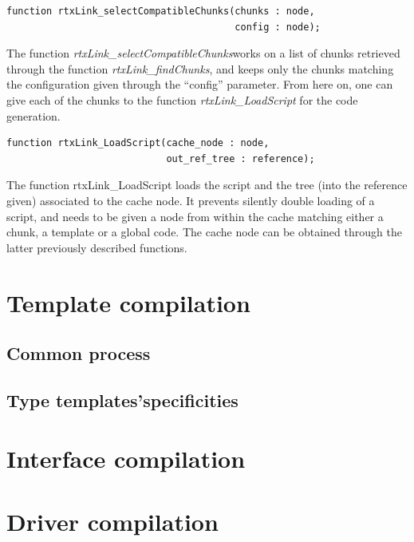 \documentclass[american]{rtxreport}
\begin{document}
\begin{lstlisting}
function rtxLink_selectCompatibleChunks(chunks : node,
                                        config : node);
\end{lstlisting} The function \emph{rtxLink\_selectCompatibleChunks}works on a
list of chunks retrieved through the function \emph{rtxLink\_findChunks}, and
keeps only the chunks matching the configuration given through the ``config''
parameter. From here on, one can give each of the chunks to the function
\emph{rtxLink\_LoadScript} for the code generation.


\begin{lstlisting}
function rtxLink_LoadScript(cache_node : node,
                            out_ref_tree : reference);
\end{lstlisting}
The function rtxLink\_LoadScript loads the script and the tree (into the
reference given) associated to the cache node. It prevents silently double
loading of a script, and needs to be given a node from within the cache
matching either a chunk, a template or a global code. The cache node can be
obtained through the latter previously described functions.



\section{Template compilation}
\subsection{Common process}
\subsection{Type templates'specificities}

\section{Interface compilation}


\section{Driver compilation}
\end{document}
